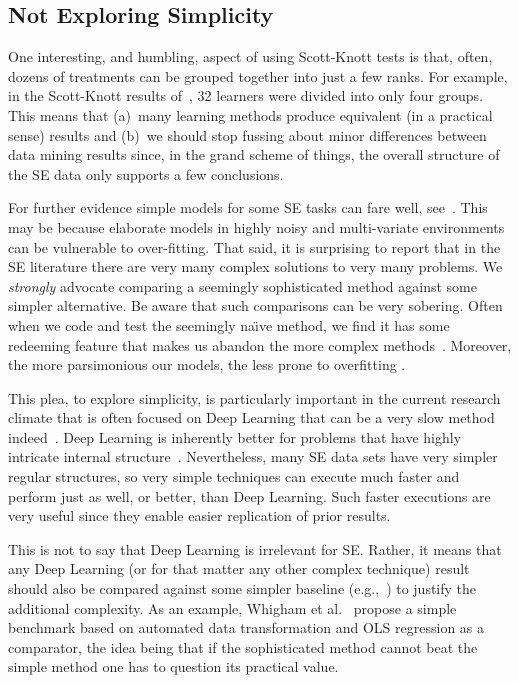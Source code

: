 \documentclass[preprint,10pt]{elsarticle}
\begin{document}
 
\subsection{Not Exploring Simplicity}

One interesting, and humbling, aspect of using Scott-Knott tests is that, often, dozens of treatments can be grouped together into just a few ranks. For example, in the Scott-Knott results of~\cite{ghotra2015}, 32 learners were divided into only four groups.  This means that (a)~many learning methods produce equivalent (in a practical sense) results and (b)~we should stop fussing about minor differences between data mining results since, in the grand scheme of things, the overall structure of the SE data only supports a few conclusions.%

For further evidence simple models for some SE tasks can fare well, see~\cite{hindle2012,hellendoorn2017,fu2017easy}.  This may be because elaborate models in highly noisy and multi-variate environments can be vulnerable to over-fitting. That said, it is surprising to report that in the SE literature there are very many complex solutions to very many problems.  We {\em strongly} advocate comparing a seemingly sophisticated method against some simpler alternative. Be aware that such comparisons can be very sobering. Often when we code and test the seemingly na\"{\i}ve method, we find it has some redeeming feature that makes us abandon the more complex methods~\cite{chen2018, fu2017, krishna18a}.  Moreover, the more parsimonious our models, the less prone to overfitting \cite{Hawk04}.
 
This plea, to explore simplicity, is particularly important in the current research climate that is often focused on  Deep Learning that can be a very slow method indeed~\cite{fu2017easy}. Deep Learning is inherently better for problems that have highly intricate internal structure~\cite{lecun2015deep}. Nevertheless, many SE data sets have very simpler regular structures, so very simple techniques can execute much faster and perform just as well, or better, than Deep Learning. Such faster executions are very useful since they enable easier replication of prior results.

This is not to say that Deep Learning is irrelevant for SE. Rather, it means that any Deep Learning (or for that matter any other complex technique) result should also be compared against some simpler baseline (e.g.,~\cite{fu2017}) to justify the additional complexity.  As an example, Whigham et al.~\cite{Whig15} propose a simple benchmark based on automated data transformation and OLS regression as a comparator, the idea being that if the sophisticated method cannot beat the simple method one has to question its practical value.
\end{document}
